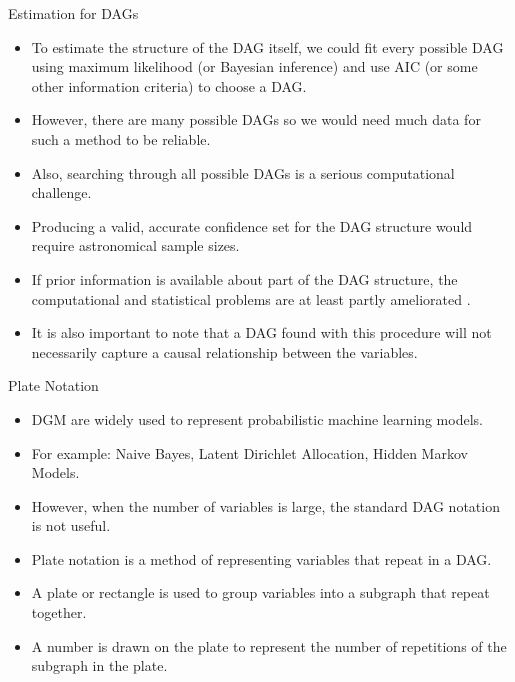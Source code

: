 \documentclass[handout]{beamer}
\begin{document}
\begin{frame}{Estimation for DAGs}
\scriptsize{
\begin{itemize}

\item To estimate the structure of the DAG itself, we could fit every possible DAG using maximum likelihood (or Bayesian inference) and use AIC (or some other information criteria) to choose a DAG.

\item However, there are many possible DAGs so we would need much data for such a method to be reliable.

\item Also, searching through all possible DAGs is a serious computational challenge. 

\item Producing a valid, accurate confidence set for the DAG structure would require astronomical sample sizes. 

\item If prior information is available about part of the DAG structure, the computational and statistical problems are at least partly ameliorated \cite{wasserman2013all}.

\item It is also important to note that a DAG found with this procedure will not necessarily capture a causal relationship between the variables.

\end{itemize}



} 

\end{frame}


\begin{frame}{Plate Notation}
\scriptsize{
\begin{itemize}
\item DGM are widely used to represent probabilistic machine learning models.

\item For example: Naive Bayes, Latent Dirichlet Allocation, Hidden Markov Models.

\item However, when the number of variables is large, the standard DAG notation is not useful.

\item Plate notation is a method of representing variables that repeat in a DAG.

\item A plate or rectangle is used to group variables into a subgraph that repeat together.

\item A number is drawn on the plate to represent the number of repetitions of the subgraph in the plate.
 
\end{itemize}



} 

\end{frame}
\end{document}
